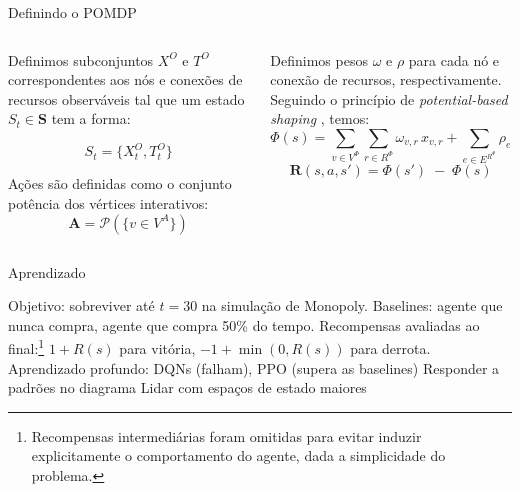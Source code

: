 \documentclass[aspectratio=169]{beamer}
\newcommand{\A}{\mathbf{A}}
\newcommand{\R}{\mathbf{R}}
\begin{document}
\begin{frame}{Definindo o POMDP}
    \begin{columns}
	\begin{column}{0.5\textwidth}
        Definimos subconjuntos $X^O$ e $T^O$ correspondentes aos nós e conexões de recursos observáveis tal que um estado $S_t \in \mathbf{S}$ tem a forma:

        $$
        S_t = \{X^O_t, T^O_t\}
        $$

	    Ações são definidas como o conjunto potência dos vértices interativos: 
        $$
        \A = \mathcal{P}(\{ v \in V^A \})
        $$
	\end{column}
	\begin{column}{0.5\textwidth}
        Definimos pesos $\omega$ e $\rho$ para cada nó e conexão de recursos, respectivamente. Seguindo o princípio de \textit{potential-based shaping} \parencite{potential-rl}, temos:
        $$
        \Phi(s) = \sum_{v\in V^{\Phi}}\sum_{r \in R^{\Phi}}\omega_{v,r}\,x_{v,r}+\sum_{e\in E^{R^{\Phi}}}\rho_{e}\,T_{e}
        $$
        $$
        \R(s,a,s') = \Phi(s') \;-\; \Phi(s)
        $$
    \end{column}
    \end{columns}
\end{frame}

\begin{frame}{Aprendizado}
    \begin{outline}
	\1 Objetivo: sobreviver até $t = 30$ na simulação de Monopoly.
	    \2 Baselines: agente que nunca compra, agente que compra 50\% do tempo.
    \1 Recompensas avaliadas ao final:\footnote{Recompensas intermediárias foram omitidas para evitar induzir explicitamente o comportamento do agente, dada a simplicidade do problema.}
        \2 $1 + R(s)$ para vitória, $-1 + \min(0, R(s))$ para derrota.
	\vspace{0.25cm}
        \1 Aprendizado profundo: DQNs (falham), PPO (supera as baselines)
	    \2 Responder a padrões no diagrama %
	    \2 Lidar com espaços de estado maiores %
    \end{outline}
\end{frame}
\end{document}
